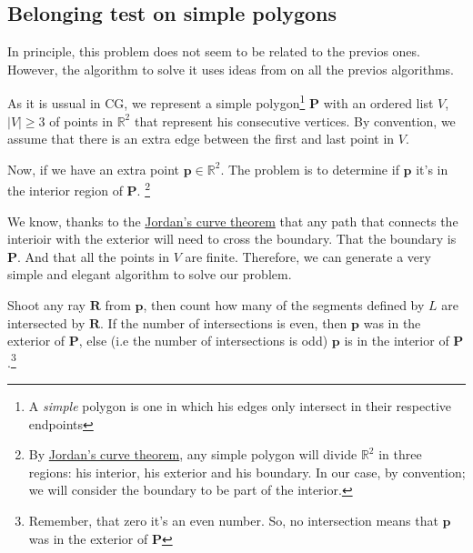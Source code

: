 {\centering
\begin{minipage}{\linewidth}
\end{minipage}
\par
}

\subsection{Belonging test on simple polygons}
\label{sec:belongTest}

In principle, this problem does not seem to be related to the previos ones.
However, the algorithm to solve it uses ideas from on all the previos algorithms.

As it is ussual in CG, we represent a simple polygon\footnote{A \emph{simple} polygon is one in which his edges only intersect in their respective endpoints} $\mathbf{P}$ with an ordered list $V$, $|V| \geq 3$ of points in $\mathbb{R}^2$ that represent his consecutive vertices.
By convention, we assume that there is an extra edge between the first and last point in $V$.

Now, if we have an extra point $\mathbf{p} \in \mathbb{R}^2$.
The problem is to determine if $\mathbf{p}$ it's in the interior region of $\mathbf{P}$.
\footnote{By \href{https://en.wikipedia.org/wiki/Jordan_curve_theorem}{Jordan's curve theorem}, any simple polygon will divide $\mathbb{R}^2$ in three regions: his interior, his exterior and his boundary. In our case, by convention; we will consider the boundary to be part of the interior.}

We know, thanks to the \href{https://en.wikipedia.org/wiki/Jordan_curve_theorem}{Jordan's curve theorem} that any path that connects the interioir with the exterior will need to cross the boundary.
That the boundary is $\mathbf{P}$.
And that all the points in $V$ are finite. 
Therefore, we can generate a very simple and elegant algorithm to solve our problem.

Shoot any ray $\mathbf{R}$ from $\mathbf{p}$, then count how many of the segments defined by $L$ are intersected by $\mathbf{R}$. 
If the number of intersections is even, then $\mathbf{p}$ was in the exterior of $\mathbf{P}$, else (i.e the number of intersections is odd) $\mathbf{p}$ is in the interior of $\mathbf{P}$.\footnote{Remember, that zero it's an even number. So, no intersection means that $\mathbf{p}$ was in the exterior of $\mathbf{P}$}

